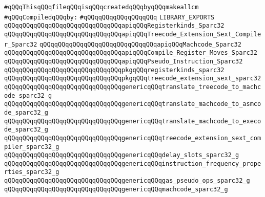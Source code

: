 \label{src/lib/compiler/back/low/sparc32/backend-sparc32.lib}
\verb|#qQQqThisqQQqfileqQQqisqQQqcreatedqQQqbyqQQqmakeallcm|\newline
\newline
\verb|#qQQqCompiledqQQqby:|\newline
\verb|#qQQqqQQqqQQqqQQqqQQq|\newline
\newline
\verb|LIBRARY_EXPORTS|\newline
\newline
\verb|qQQqqQQqqQQqqQQqqQQqqQQqqQQqqQQqapiqQQqRegisterkinds_Sparc32|\newline
\verb|qQQqqQQqqQQqqQQqqQQqqQQqqQQqqQQqapiqQQqTreecode_Extension_Sext_Compiler_Sparc32|\newline
\verb|qQQqqQQqqQQqqQQqqQQqqQQqqQQqqQQqapiqQQqMachcode_Sparc32|\newline
\verb|qQQqqQQqqQQqqQQqqQQqqQQqqQQqqQQqapiqQQqCompile_Register_Moves_Sparc32|\newline
\verb|qQQqqQQqqQQqqQQqqQQqqQQqqQQqqQQqapiqQQqPseudo_Instruction_Sparc32|\newline
\newline
\verb|qQQqqQQqqQQqqQQqqQQqqQQqqQQqqQQqpkgqQQqregisterkinds_sparc32|\newline
\verb|qQQqqQQqqQQqqQQqqQQqqQQqqQQqqQQqpkgqQQqtreecode_extension_sext_sparc32|\newline
\newline
\verb|qQQqqQQqqQQqqQQqqQQqqQQqqQQqqQQqgenericqQQqtranslate_treecode_to_machcode_sparc32_g|\newline
\verb|qQQqqQQqqQQqqQQqqQQqqQQqqQQqqQQqgenericqQQqtranslate_machcode_to_asmcode_sparc32_g|\newline
\verb|qQQqqQQqqQQqqQQqqQQqqQQqqQQqqQQqgenericqQQqtranslate_machcode_to_execode_sparc32_g|\newline
\verb|qQQqqQQqqQQqqQQqqQQqqQQqqQQqqQQqgenericqQQqtreecode_extension_sext_compiler_sparc32_g|\newline
\verb|qQQqqQQqqQQqqQQqqQQqqQQqqQQqqQQqgenericqQQqdelay_slots_sparc32_g|\newline
\verb|qQQqqQQqqQQqqQQqqQQqqQQqqQQqqQQqgenericqQQqinstruction_frequency_properties_sparc32_g|\newline
\verb|qQQqqQQqqQQqqQQqqQQqqQQqqQQqqQQqgenericqQQqgas_pseudo_ops_sparc32_g|\newline
\verb|qQQqqQQqqQQqqQQqqQQqqQQqqQQqqQQqgenericqQQqmachcode_sparc32_g|\newline
